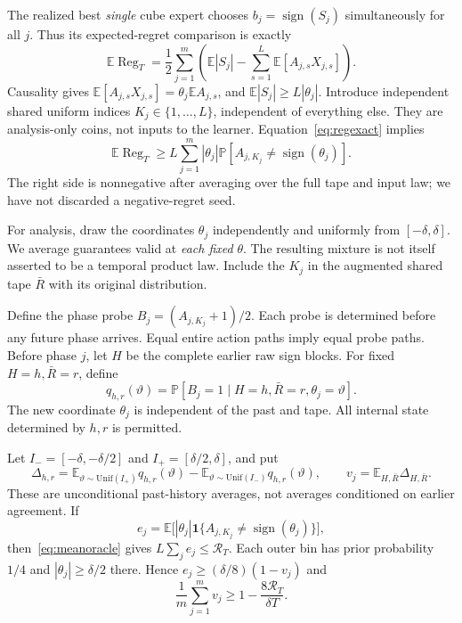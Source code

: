 \documentclass[11pt]{article}
\newcommand{\E}{\mathbb E}
\newcommand{\Prob}{\mathbb P}
\newcommand{\1}{\mathbf 1}
\newcommand{\Reg}{\operatorname{Reg}}
\begin{document}
The realized best \emph{single} cube expert chooses
$b_j=\operatorname{sign}(S_j)$ simultaneously for all $j$.
Thus its expected-regret comparison is exactly
\begin{equation}\label{eq:regexact}
 \E\Reg_T=\frac12\sum_{j=1}^m
   \left(\E|S_j|-\sum_{s=1}^L\E[A_{j,s}X_{j,s}]\right).
\end{equation}
Causality gives $\E[A_{j,s}X_{j,s}]=\theta_j\E A_{j,s}$,
and $\E|S_j|\ge L|\theta_j|$. Introduce independent shared
uniform indices $K_j\in\{1,\ldots,L\}$, independent of everything
else. They are analysis-only coins, not inputs to the learner.
Equation~\eqref{eq:regexact} implies
\begin{equation}\label{eq:meanoracle}
 \E\Reg_T\ge
 L\sum_{j=1}^m|\theta_j|
       \Prob[A_{j,K_j}\ne\operatorname{sign}(\theta_j)].
\end{equation}
The right side is nonnegative after averaging over the full tape
and input law; we have not discarded a negative-regret seed.

For analysis, draw the coordinates $\theta_j$ independently and
uniformly from $[-\delta,\delta]$. We average guarantees valid at
\emph{each fixed} $\theta$. The resulting mixture is not itself
asserted to be a temporal product law. Include the $K_j$ in the
augmented shared tape $\bar R$ with its original distribution.

Define the phase probe $B_j=(A_{j,K_j}+1)/2$. Each probe is determined
before any future phase arrives. Equal entire action paths imply
equal probe paths. Before phase $j$, let $H$ be the complete earlier
raw sign blocks. For fixed $H=h,\bar R=r$, define
\[
 q_{h,r}(\vartheta)
 =\Prob[B_j=1\mid H=h,\bar R=r,\theta_j=\vartheta].
\]
The new coordinate $\theta_j$ is independent of the past and tape.
All internal state determined by $h,r$ is permitted.

Let $I_-=[-\delta,-\delta/2]$ and $I_+=[\delta/2,\delta]$, and put
\[
 \Delta_{h,r}=\E_{\vartheta\sim\mathrm{Unif}(I_+)}q_{h,r}(\vartheta)
             -\E_{\vartheta\sim\mathrm{Unif}(I_-)}q_{h,r}(\vartheta),
 \qquad v_j=\E_{H,\bar R}\Delta_{H,\bar R}.
\]
These are unconditional past-history averages, not averages
conditioned on earlier agreement. If
\[
 e_j=\E\bigl[|\theta_j|
    \1\{A_{j,K_j}\ne\operatorname{sign}(\theta_j)\}\bigr],
\]
then~\eqref{eq:meanoracle} gives
$L\sum_j e_j\le\mathcal R_T$. Each outer bin has prior probability $1/4$
and $|\theta_j|\ge\delta/2$ there. Hence
$e_j\ge(\delta/8)(1-v_j)$ and
\begin{equation}\label{eq:response}
 \frac1m\sum_{j=1}^m v_j\ge1-\frac{8\mathcal R_T}{\delta T}.
\end{equation}
\end{document}
